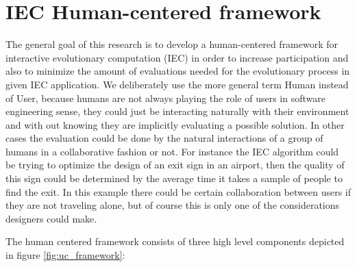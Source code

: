 \documentclass[conference]{IEEEtran}
\begin{document}

 \section{IEC Human-centered framework}
\label{sec:graph}
The general goal of this research is to develop a human-centered \cite{gasson2003human} framework
for interactive evolutionary computation (IEC) in order to increase
participation and also to minimize the amount of evaluations needed for the
evolutionary process in given IEC application. We deliberately use the 
more general
term Human instead of User, because humans are not always playing the role of
users in software engineering sense, they could just be interacting 
naturally with their environment and with out knowing they are implicitly
evaluating a possible solution. In other cases the evaluation could be done
by the natural interactions of a group of humans in a collaborative fashion
or not. For instance the IEC algorithm could be trying to optimize 
the design of an exit sign in an airport, then the quality of this sign could be
determined by the average time it takes a sample of people to 
find the exit. In this example there could be certain collaboration
between users if they are not traveling alone, but of course this is only one of
the considerations designers could make. 


The human centered framework consists of three high level components depicted
in figure \ref{fig:uc_framework}:
\end{document}

